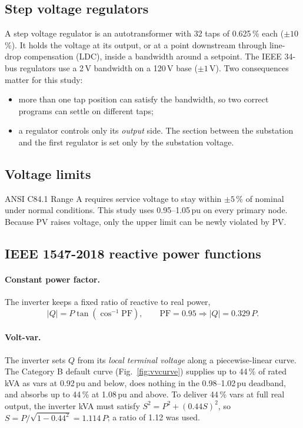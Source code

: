 \documentclass[11pt,letterpaper]{article}
\begin{document}
\subsection{Step voltage regulators}
A step voltage regulator is an autotransformer with 32 taps of 0.625\,\% each ($\pm10$\,\%). It holds the voltage
at its output, or at a point downstream through line-drop compensation (LDC), inside a bandwidth around a
setpoint. The IEEE 34-bus regulators use a 2\,V bandwidth on a 120\,V base ($\pm 1$\,V). Two consequences
matter for this study:
\begin{itemize}
  \item more than one tap position can satisfy the bandwidth, so two correct programs can settle on
        different taps;
  \item a regulator controls only its \emph{output} side. The section between the substation and the first
        regulator is set only by the substation voltage.
\end{itemize}

\subsection{Voltage limits}
ANSI C84.1 Range A requires service voltage to stay within $\pm5$\,\% of nominal under normal conditions.
This study uses 0.95--1.05\,pu on every primary node. Because PV raises voltage, only the upper limit can be
newly violated by PV.

\subsection{IEEE 1547-2018 reactive power functions}
\paragraph{Constant power factor.} The inverter keeps a fixed ratio of reactive to real power,
\begin{equation}
  |Q| = P \tan\!\left(\cos^{-1}\mathrm{PF}\right), \qquad \mathrm{PF}=0.95 \Rightarrow |Q| = 0.329\,P.
\end{equation}
\paragraph{Volt-var.} The inverter sets $Q$ from its \emph{local terminal voltage} along a piecewise-linear
curve. The Category B default curve (Fig.~\ref{fig:vvcurve}) supplies up to 44\,\% of rated kVA as vars at
0.92\,pu and below, does nothing in the 0.98--1.02\,pu deadband, and absorbs up to 44\,\% at 1.08\,pu and above.
To deliver 44\,\% vars at full real output, the inverter kVA must satisfy $S^2 = P^2 + (0.44S)^2$, so
$S = P/\sqrt{1-0.44^2} = 1.114\,P$; a ratio of 1.12 was used.
\end{document}
